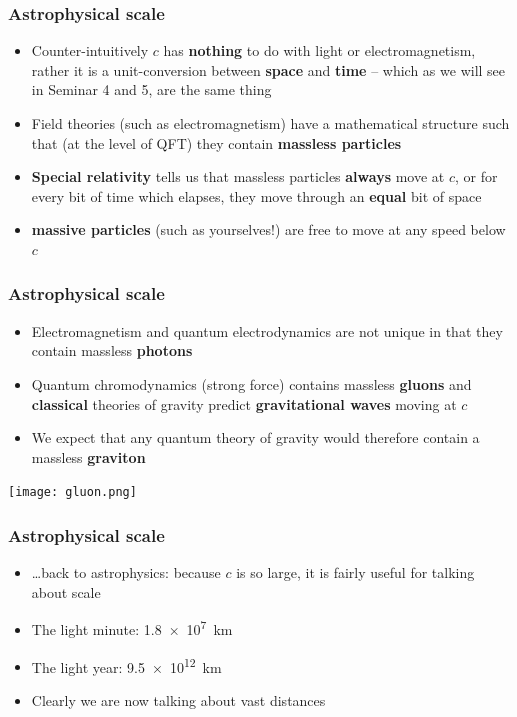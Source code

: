 \documentclass{beamer}
\begin{document}
\begin{frame}
  \frametitle{Astrophysical scale}
  \begin{itemize}
    \item Counter-intuitively $c$ has \textbf{nothing} to do with light or electromagnetism, rather it is a unit-conversion between \textbf{space} and \textbf{time} -- which as we will see in Seminar 4 and 5, are the same thing
    \item Field theories (such as electromagnetism) have a mathematical structure such that (at the level of QFT) they contain \textbf{massless particles}
    \item \textbf{Special relativity} tells us that massless particles \textbf{always} move at $c$, or for every bit of time which elapses, they move through an \textbf{equal} bit of space
    \item \textbf{massive particles} (such as yourselves!) are free to move at any speed below $c$
  \end{itemize}
\end{frame}

\begin{frame}
  \frametitle{Astrophysical scale}
  \begin{itemize}
    \item Electromagnetism and quantum electrodynamics are not unique in that they contain massless \textbf{photons}
    \item Quantum chromodynamics (strong force) contains massless \textbf{gluons} and \textbf{classical} theories of gravity predict \textbf{gravitational waves} moving at $c$
    \item We expect that any quantum theory of gravity would therefore contain a massless \textbf{graviton}
  \end{itemize}
  \center
  \texttt{[image: gluon.png]}
\end{frame}

\begin{frame}
  \frametitle{Astrophysical scale}
  \begin{itemize}
    \item \ldots back to astrophysics: because $c$ is so large, it is fairly useful for talking about scale
    \item The light minute: \SI{1.8e7}{km}
    \item The light year: \SI{9.5e12}{km}
    \item Clearly we are now talking about vast distances
  \end{itemize}
\end{frame}
\end{document}
